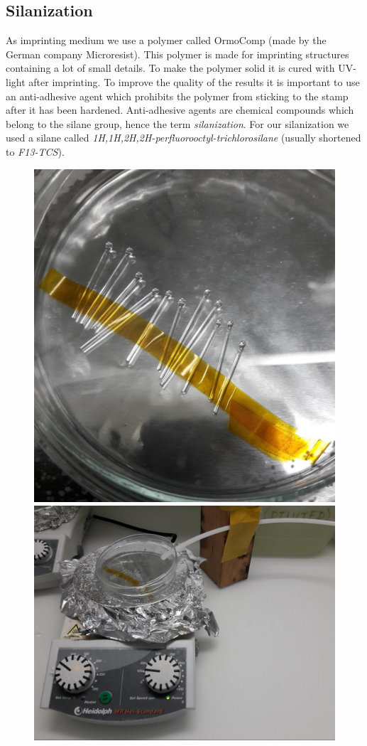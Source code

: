 \subsection{Silanization}
As imprinting medium we use a polymer called OrmoComp (made by the German company Microresist). This polymer is made for imprinting structures containing a lot of small details. To make the polymer solid it is cured with UV-light after imprinting. To improve the quality of the results it is important to use an anti-adhesive agent which prohibits the polymer from sticking to the stamp after it has been hardened. Anti-adhesive agents are chemical compounds which belong to the silane group, hence the term \textit{silanization}. For our silanization we used a silane called \textit{1H,1H,2H,2H-perfluorooctyl-trichlorosilane} (usually shortened to \textit{F13-TCS}).
\begin{figure}[H]
	\includegraphics[scale=0.1]{source/stamps_taped}
	\includegraphics[scale=0.14]{source/silanization}

\end{figure}
